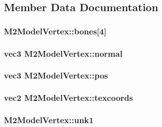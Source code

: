 \subsection{Member Data Documentation}
\hypertarget{struct_m2_model_vertex_a1d3b6f7681c9a8123148b9f9afd0550c}{
\subsubsection[{bones}]{ M2\+Model\+Vertex\+::bones\mbox{[}4\mbox{]}}}\label{struct_m2_model_vertex_a1d3b6f7681c9a8123148b9f9afd0550c}
\hypertarget{struct_m2_model_vertex_a2c504157711a4058f726689be5e11f19}{
\subsubsection[{normal}]{\setlength{\rightskip}{0pt plus 5cm}vec3 M2\+Model\+Vertex\+::normal}}\label{struct_m2_model_vertex_a2c504157711a4058f726689be5e11f19}
\hypertarget{struct_m2_model_vertex_a76d4904ffa0f9b283abd1616959eafd4}{
\subsubsection[{pos}]{\setlength{\rightskip}{0pt plus 5cm}vec3 M2\+Model\+Vertex\+::pos}}\label{struct_m2_model_vertex_a76d4904ffa0f9b283abd1616959eafd4}
\hypertarget{struct_m2_model_vertex_a53da447a7c914956d9eafbc65e43ec42}{
\subsubsection[{texcoords}]{\setlength{\rightskip}{0pt plus 5cm}vec2 M2\+Model\+Vertex\+::texcoords}}\label{struct_m2_model_vertex_a53da447a7c914956d9eafbc65e43ec42}
\hypertarget{struct_m2_model_vertex_a435495b79cb0253d42c6dd55d68688c9}{
\subsubsection[{unk1}]{ M2\+Model\+Vertex\+::unk1}}\label{struct_m2_model_vertex_a435495b79cb0253d42c6dd55d68688c9}

